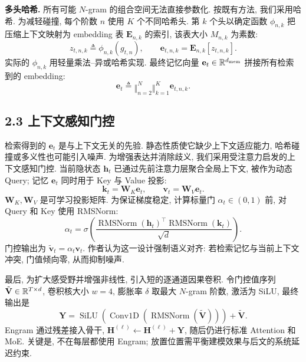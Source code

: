 \noindent\textbf{多头哈希.}\label{engram-multi-head-hash}
所有可能 $N$-gram 的组合空间无法直接参数化. 按既有方法\cite{engram-tito2017hash}, 我们采用哈希. 为减轻碰撞, 每个阶数 $n$ 使用 $K$ 个不同哈希头. 第 $k$ 个头以确定函数 $\phi_{n,k}$ 把压缩上下文映射为 embedding 表 $\mathbf E_{n,k}$ 的索引, 该表大小 $M_{n,k}$ 为素数:
\begin{equation}\label{engram-eq-1}
z_{t,n,k}\triangleq\phi_{n,k}(g_{t,n}),\qquad
\mathbf e_{t,n,k}=\mathbf E_{n,k}[z_{t,n,k}].
\end{equation}
实际的 $\phi_{n,k}$ 用轻量乘法--异或哈希实现. 最终记忆向量 $\mathbf e_t\in\mathbb R^{d_{\rm mem}}$ 拼接所有检索到的 embedding:
\begin{equation}\label{engram-eq-2}
\mathbf e_t\triangleq\mathop{\Vert}_{n=2}^{N}\mathop{\Vert}_{k=1}^{K}\mathbf e_{t,n,k}.
\end{equation}

\subsection*{2.3 上下文感知门控}
检索得到的 $\mathbf e_t$ 是与上下文无关的先验. 静态性质使它缺少上下文适应能力, 哈希碰撞或多义性也可能引入噪声\cite{engram-haber-poesio-2024-polysemy}. 为增强表达并消除歧义, 我们采用受注意力启发的上下文感知门控\cite{engram-vaswani2017attention,engram-bahdanau2014neural}. 当前隐状态 $\mathbf h_t$ 已通过先前注意力层聚合全局上下文, 被作为动态 Query; 记忆 $\mathbf e_t$ 同时用于 Key 与 Value 投影:
\begin{equation}\label{engram-eq-3}
\mathbf k_t=\mathbf W_K\mathbf e_t,\qquad\mathbf v_t=\mathbf W_V\mathbf e_t.
\end{equation}
$\mathbf W_K,\mathbf W_V$ 是可学习投影矩阵. 为保证梯度稳定\cite{engram-pmlr-v202-dehghani23a}, 计算标量门 $\alpha_t\in(0,1)$ 前, 对 Query 和 Key 使用 RMSNorm\cite{engram-zhang2019root}:
\begin{equation}\label{engram-eq-4}
\alpha_t=\sigma\left(\frac{\operatorname{RMSNorm}(\mathbf h_t)^\top
\operatorname{RMSNorm}(\mathbf k_t)}{\sqrt d}\right).
\end{equation}
门控输出为 $\tilde{\mathbf v}_t=\alpha_t\mathbf v_t$. 作者认为这一设计强制语义对齐: 若检索记忆与当前上下文冲突, 门值倾向零, 从而抑制噪声.

最后, 为扩大感受野并增强非线性, 引入短的逐通道因果卷积\cite{engram-gu2021efficiently,engram-peng2023rwkv}. 令门控值序列 $\tilde{\mathbf V}\in\mathbb R^{T\times d}$, 卷积核大小 $w=4$, 膨胀率 $\delta$ 取最大 $N$-gram 阶数, 激活为 SiLU\cite{engram-elfwing2018sigmoid}, 最终输出是
\begin{equation}\label{engram-eq-5}
\mathbf Y=\operatorname{SiLU}\left(\operatorname{Conv1D}
(\operatorname{RMSNorm}(\tilde{\mathbf V}))\right)+\tilde{\mathbf V}.
\end{equation}
Engram 通过残差接入骨干, $\mathbf H^{(\ell)}\leftarrow\mathbf H^{(\ell)}+\mathbf Y$, 随后仍进行标准 Attention 和 MoE. 关键是, 不在每层都使用 Engram; 放置位置需平衡建模效果与后文的系统延迟约束.

